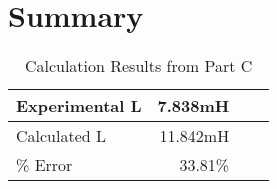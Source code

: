 \documentclass[../Lab.tex]{subfiles}
\begin{document}
\section{Summary}


\begin{table}[htbp]
  \centering
  \caption{Calculation Results from Part C}
    \begin{tabular}{|l|r|r|r|}
    \hline
    Experimental L & 7.838mH\\
    \hline
    Calculated L & 11.842mH\\
    \hline
    \% Error & 33.81\%\\
    \hline
    \end{tabular}%
  \label{tab:addlabel}%
\end{table}%
\end{document}
